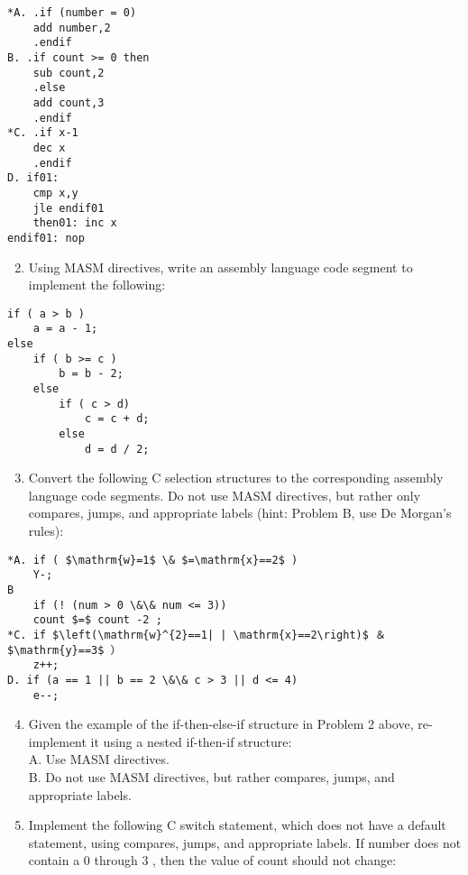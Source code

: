 \documentclass[10pt]{article}
\begin{document}
\begin{verbatim}
*A. .if (number = 0)
    add number,2
    .endif
B. .if count >= 0 then
    sub count,2
    .else
    add count,3
    .endif
*C. .if x-1
    dec x
    .endif
D. if01:
    cmp x,y
    jle endif01
    then01: inc x
endif01: nop
\end{verbatim}

\begin{enumerate}
  \setcounter{enumi}{1}
  \item Using MASM directives, write an assembly language code segment to implement the following:
\end{enumerate}

\begin{verbatim}
if ( a > b )
    a = a - 1;
else
    if ( b >= c )
        b = b - 2;
    else
        if ( c > d)
            c = c + d;
        else
            d = d / 2;
\end{verbatim}

\begin{enumerate}
  \setcounter{enumi}{2}
  \item Convert the following C selection structures to the corresponding assembly language code segments. Do not use MASM directives, but rather only compares, jumps, and appropriate labels (hint: Problem B, use De Morgan's rules):
\end{enumerate}

\begin{verbatim}
*A. if ( $\mathrm{w}=1$ \& $=\mathrm{x}==2$ )
    Y-;
B
    if (! (num > 0 \&\& num <= 3))
    count $=$ count -2 ;
*C. if $\left(\mathrm{w}^{2}==1| | \mathrm{x}==2\right)$ ＆ $\mathrm{y}==3$ ）
    z++;
D. if (a == 1 || b == 2 \&\& c > 3 || d <= 4)
    e--;
\end{verbatim}

\begin{enumerate}
  \setcounter{enumi}{3}
  \item Given the example of the if-then-else-if structure in Problem 2 above, re-implement it using a nested if-then-if structure:\\
A. Use MASM directives.\\
B. Do not use MASM directives, but rather compares, jumps, and appropriate labels.
  \item Implement the following C switch statement, which does not have a default statement, using compares, jumps, and appropriate labels. If number does not contain a 0 through 3 , then the value of count should not change:
\end{enumerate}
\end{document}

